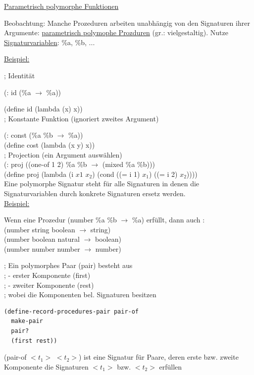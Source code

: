 \documentclass[a4paper, 20pt, openany]{book}
\begin{document}
\underline{Parametrisch polymorphe Funktionen}

Beobachtung: Manche Prozeduren arbeiten unabhängig von den Signaturen ihrer Argumente: \underline{parametrisch polymophe Prozduren} (gr.: vielgestaltig). Nutze \underline{Signaturvariablen}: \%a, \%b, ...

\underline{Beispiel:}

; Identität

(: id (\%a $\rightarrow$ \%a))

(define id (lambda (x) x)) \\

; Konstante Funktion (ignoriert zweites Argument)

(: const (\%a \%b $\rightarrow$ \%a)) \\
(define cost (lambda (x y) x)) \\

; Projection (ein Argument auswählen) \\
(: proj ((one-of 1 2) \%a \%b $\rightarrow$ (mixed \%a \%b))) \\
(define proj (lambda (i $x1$ $x_2$) (cond ((= i 1) $x_1$) ((= i 2) $x_2$)))) \\

Eine polymorphe Signatur steht für alle Signaturen in denen die Signaturvariablen durch konkrete Signaturen ersetz werden. \\

\underline{Beispiel:}

Wenn eine Prozedur (number \%a \%b $\rightarrow$ \%a) erfüllt, dann auch : \\
(number string boolean $\rightarrow$ string) \\
(number boolean natural $\rightarrow$ boolean) \\
(number number number $\rightarrow$ number)

; Ein polymorphes Paar (pair) besteht aus \\
; - erster Komponente (first) \\
; - zweiter Komponente (rest) \\
; wobei die Komponenten bel. Signaturen besitzen \\
\begin{lstlisting}
(define-record-procedures-pair pair-of 
  make-pair 
  pair? 
  (first rest))
\end{lstlisting} 

(pair-of $<t_1>$ $<t_2>$) ist eine Signatur für Paare, deren erste bzw. zweite Komponente die Signaturen $<t_1>$ bzw. $<t_2>$ erfüllen \\
\end{document}

